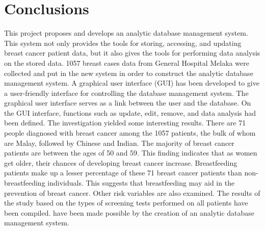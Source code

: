 \documentclass[10pt,a4paper,twoside]{article}
\begin{document}
\section{Conclusions}
This project proposes and develops an analytic database management system. This system not only provides the tools for storing, accessing, and updating breast cancer patient data, but it also gives the tools for performing data analysis on the stored data. 1057 breast cases data from General Hospital Melaka were collected and put in the new system in order to construct the analytic database management system. A graphical user interface (GUI) has been developed to give a user-friendly interface for controlling the database management system. The graphical user interface serves as a link between the user and the database. On the GUI interface, functions such as update, edit, remove, and data analysis had been defined.
\vspace{0.3cm}
The investigation yielded some interesting results. There are 71 people diagnosed with breast cancer among the 1057 patients, the bulk of whom are Malay, followed by Chinese and Indian. The majority of breast cancer patients are between the ages of 50 and 59. This finding indicates that as women get older, their chances of developing breast cancer increase. Breastfeeding patients make up a lesser percentage of these 71 breast cancer patients than non-breastfeeding individuals. This suggests that breastfeeding may aid in the prevention of breast cancer.
Other risk variables are also examined. The results of the study based on the types of screening tests performed on all patients have been compiled.
have been made possible by the creation of an analytic database management system.
\end{document}

